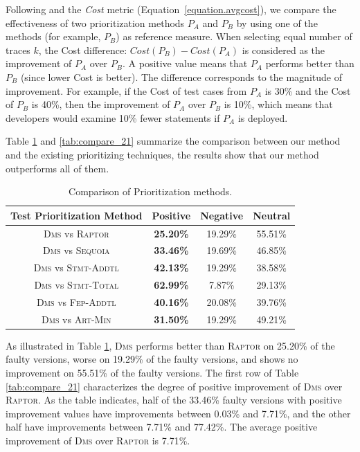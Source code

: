 Following \cite{BaahPH10,BaahPH11} and the {\em Cost}
metric (Equation~\ref{equation.avgcost}), we compare
the effectiveness of two prioritization methods $P_A$ and $P_B$ by using
one of the methods (for example, $P_B$) as reference measure.
When selecting equal number of traces $k$, the Cost difference:
$Cost(P_B) - Cost(P_A)$ is considered as the improvement of $P_A$
over $P_B$. A positive value means that $P_A$ performs better than
$P_B$ (since lower Cost is better). The difference corresponds
to the magnitude of improvement. For example, if the Cost of
test cases from $P_A$ is 30\% and the Cost of $P_B$ is 40\%,
then the improvement of $P_A$ over $P_B$ is 10\%, which means
that developers would examine 10\% fewer statements if $P_A$
is deployed.

\vspace{0.2cm}
 Table \ref{tab:compare_11} and \ref{tab:compare_21} summarize the comparison
between our method and the existing prioritizing techniques, the results show that
our method outperforms all of them.

\begin{table}[!htbp]
    \centering
		\caption{Comparison of Prioritization methods.}
		\renewcommand{\arraystretch}{1.5}
		\small
        \begin{tabular}{|c|c|c|c|}
			\hline
			Test Prioritization Method  &  Positive  &  Negative  &   Neutral  \\
			\hline\hline
			\textsc{Dms} vs \textsc{Raptor} & {\bf 25.20\%} &    19.29\% &    55.51\% \\
			\hline
			\textsc{Dms} vs \textsc{Sequoia} & {\bf 33.46\%} &    19.69\% &    46.85\% \\
			\hline
			\textsc{Dms} vs \textsc{Stmt-Addtl} & {\bf 42.13\%} &    19.29\% &    38.58\% \\
			\hline
			\textsc{Dms} vs \textsc{Stmt-Total} & {\bf 62.99\%} &     7.87\% &    29.13\% \\
			\hline
			\textsc{Dms} vs \textsc{Fep-Addtl} & {\bf 40.16\%} &    20.08\% &    39.76\% \\
			\hline
			\textsc{Dms} vs \textsc{Art-Min} & {\bf 31.50\%} &    19.29\% &    49.21\% \\
			\hline
		\end{tabular}
    \label{tab:compare_11}
\end{table}

As illustrated in Table \ref{tab:compare_11}, \textsc{Dms} performs
better than \textsc{Raptor} on 25.20\% of the faulty versions, worse
on 19.29\% of the faulty versions, and shows no improvement
on 55.51\% of the faulty versions. The first row of
Table \ref{tab:compare_21} characterizes the degree of positive improvement of
\textsc{Dms} over \textsc{Raptor}. As the table indicates, half of the 33.46\%
faulty versions with positive improvement values have improvements
between 0.03\% and 7.71\%, and the other half
have improvements between 7.71\% and 77.42\%. The average
positive improvement of \textsc{Dms} over \textsc{Raptor} is 7.71\%.

